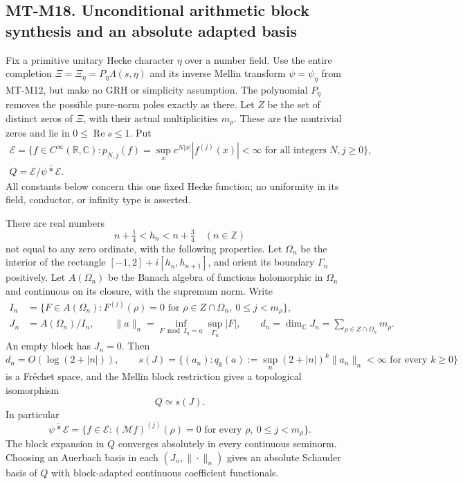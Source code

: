 \subsection*{MT-M18. Unconditional arithmetic block synthesis and an absolute adapted basis}

Fix a primitive unitary Hecke character \(\eta\) over a number field.
Use the entire completion \(\Xi=\Xi_\eta=P_\eta\Lambda(s,\eta)\)
and its inverse Mellin transform \(\psi=\psi_\eta\) from MT-M12,
but make no GRH or simplicity assumption.  The polynomial \(P_\eta\)
removes the possible pure-norm poles exactly as there.  Let \(Z\)
be the set of distinct zeros of \(\Xi\), with their actual
multiplicities \(m_\rho\).  These are the nontrivial zeros and
lie in \(0\le\operatorname{Re}s\le1\).
Put
\[
 \begin{gathered}
 \mathcal E=\{f\in C^\infty(\mathbb R,\mathbb C):
   p_{N,j}(f)=\sup_x e^{N|x|}|f^{(j)}(x)|<\infty
                    \text{ for all integers }N,j\ge0\},\\
 Q=\mathcal E/\overline{\psi*\mathcal E}.
 \end{gathered}
\]
All constants below concern this one fixed Hecke function; no
uniformity in its field, conductor, or infinity type is asserted.

There are real numbers
\[
 n+\tfrac14<h_n<n+\tfrac34\quad(n\in\mathbb Z)
\]
not equal to any zero ordinate, with the following properties.
Let \(\Omega_n\) be the interior of the rectangle
\([-1,2]+i[h_n,h_{n+1}]\), and orient its boundary
\(\Gamma_n\) positively.  Let \(A(\Omega_n)\) be the Banach
algebra of functions holomorphic in \(\Omega_n\) and continuous
on its closure, with the supremum norm.  Write
\[
 \begin{split}
 I_n&=\{F\in A(\Omega_n):
        F^{(j)}(\rho)=0\text{ for }\rho\in Z\cap\Omega_n,\
                                  0\le j<m_\rho\},\\
 J_n&=A(\Omega_n)/I_n,\qquad
 \|a\|_n=\inf_{F\bmod I_n=a}\sup_{\Gamma_n}|F|,\qquad
 d_n=\dim_{\mathbb C}J_n=\sum_{\rho\in Z\cap\Omega_n}m_\rho .
 \end{split}                                                    \tag{M18.1}
\]
An empty block has \(J_n=0\).  Then
\[
 d_n=O(\log(2+|n|)),\qquad
 s(J)=\{(a_n):q_k(a):=\sup_n(2+|n|)^k\|a_n\|_n<\infty
                                  \text{ for every }k\ge0\}      \tag{M18.2}
\]
is a Fr\'echet space, and the Mellin block restriction gives a
topological isomorphism
\[
 Q\simeq s(J).                                                    \tag{M18.3}
\]
In particular
\[
 \overline{\psi*\mathcal E}
 =\{f\in\mathcal E:(\mathcal Mf)^{(j)}(\rho)=0
                         \text{ for every }\rho,\ 0\le j<m_\rho\}.
                                                                  \tag{M18.4}
\]
The block expansion in \(Q\) converges absolutely in every
continuous seminorm.  Choosing an Auerbach basis in each
\((J_n,\|\cdot\|_n)\) gives an absolute Schauder basis of \(Q\)
with block-adapted continuous coefficient functionals.


